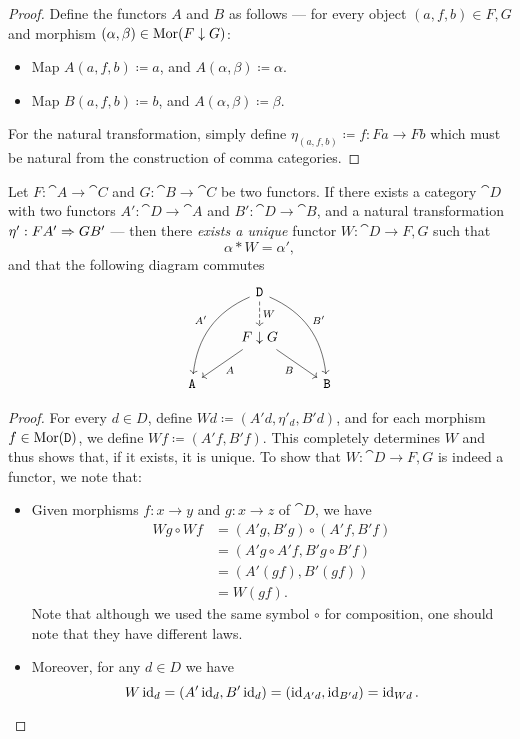 \begin{proof}
Define the functors \(A\) and \(B\) as follows --- for every object
\((a, f, b) \in F \comma G\) and morphism
\((\alpha, \beta) \in \operatorname{Mor}(F \downarrow G)\):
\begin{itemize}\setlength\itemsep{0em}
\item Map \(A(a, f, b) \coloneq a\), and \(A(\alpha, \beta) \coloneq \alpha\).
\item Map \(B(a, f, b) \coloneq b\), and \(A(\alpha, \beta) \coloneq \beta\).
\end{itemize}
For the natural transformation, simply define
\(\eta_{(a, f, b)} \coloneq f: F a \to F b\) which must be natural from the
construction of comma categories.
\end{proof}

\begin{proposition}
\label{prop:comma-cat-univ-property}
Let \(F: \cat A \to \cat C\) and \(G: \cat B \to \cat C\) be two functors. If
there exists a category \(\cat D\) with two functors \(A': \cat D \to \cat A\)
and \(B': \cat D \to \cat B\), and a natural transformation
\(\eta': F A' \Rightarrow G B'\) --- then there \emph{exists a unique} functor
\(W: \cat D \to F \comma G\) such that
\[
\alpha * W = \alpha',
\]
and that the following diagram commutes
\[
\begin{tikzcd}
&\cat D \ar[drd, bend left, "B'"] \ar[dld, bend right, "A'"']
\ar[d, dashed, "W"]
& \\
&F \comma G \ar[dr, "B"'] \ar[dl, "A"]& \\
\cat A & &\cat B
\end{tikzcd}
\]
\end{proposition}

\begin{proof}
For every \(d \in D\), define \(W d \coloneq (A' d, \eta'_d, B' d)\), and for
each morphism \(f \in \operatorname{Mor}(\texttt D)\), we define \(W f \coloneq (A' f, B'
f)\). This completely determines \(W\) and thus shows that, if it exists, it is
unique. To show that \(W: \cat D \to F \comma G\) is indeed a functor, we note
that:
\begin{itemize}\setlength\itemsep{0em}
\item Given morphisms \(f: x \to y\) and \(g: x \to z\) of \(\cat D\), we have
  \begin{align*}
  W g \circ W f
  &= (A' g, B' g) \circ (A' f, B' f) \\
  &= (A' g \circ A' f, B' g \circ B' f) \\
  &= (A' (g f), B' (g f)) \\
  &= W (g f).
  \end{align*}
  Note that although we used the same symbol \(\circ\) for composition, one
  should note that they have different laws.
\item Moreover, for any \(d \in D\) we have
  \[
  W \operatorname{id}_d
  = (A' \operatorname{id}_d, B' \operatorname{id}_d)
  = (\operatorname{id}_{A' d}, \operatorname{id}_{B' d})
  = \operatorname{id}_{W d}.
  \]
\end{itemize}
\end{proof}

